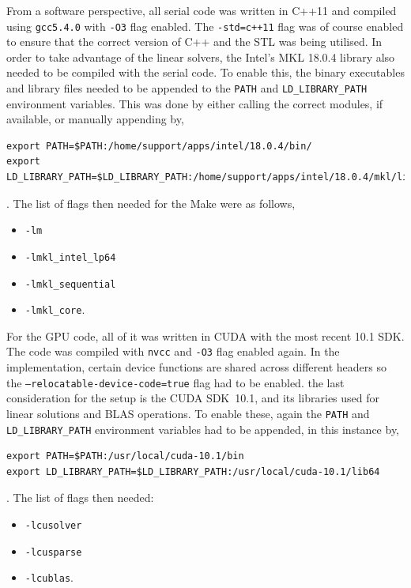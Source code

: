 From a software perspective, all serial code was written in C++11 and compiled using \texttt{gcc5.4.0} with \texttt{-O3} flag enabled. The \texttt{-std=c++11} flag was of course enabled to ensure that the correct version of C++ and the STL was being utilised. In order to take advantage of the linear solvers, the Intel's MKL 18.0.4 library also needed to be compiled with the serial code. To enable this, the binary executables and library files needed to be appended to the \texttt{PATH} and \texttt{LD\_LIBRARY\_PATH} environment variables. This was done by either calling the correct modules, if available, or manually appending by,
\begin{lstlisting}[style = bashStyle]
export PATH=$PATH:/home/support/apps/intel/18.0.4/bin/
export LD_LIBRARY_PATH=$LD_LIBRARY_PATH:/home/support/apps/intel/18.0.4/mkl/lib/intel64/intel64/
\end{lstlisting}
. The list of flags then needed for the Make were as follows,
\begin{itemize}
	\item \texttt{-lm}
	\item \texttt{-lmkl\_intel\_lp64}
	\item \texttt{-lmkl\_sequential}
	\item \texttt{-lmkl\_core}.
\end{itemize}

For the GPU code, all of it was written in CUDA with the most recent 10.1 SDK. The code was compiled with \texttt{nvcc} and \texttt{-O3} flag enabled again. In the implementation, certain device functions are shared across different headers so the \texttt{--relocatable-device-code=true} flag had to be enabled. the last consideration for the setup is the CUDA SDK~10.1, and its libraries used for linear solutions and BLAS operations. To enable these, again the \texttt{PATH} and \texttt{LD\_LIBRARY\_PATH} environment variables had to be appended, in this instance by,
\begin{lstlisting}[style = bashStyle]
export PATH=$PATH:/usr/local/cuda-10.1/bin
export LD_LIBRARY_PATH=$LD_LIBRARY_PATH:/usr/local/cuda-10.1/lib64
\end{lstlisting}
. The list of flags then needed:
\begin{itemize}
	\item \texttt{-lcusolver}
	\item \texttt{-lcusparse}
	\item \texttt{-lcublas}.
\end{itemize}

